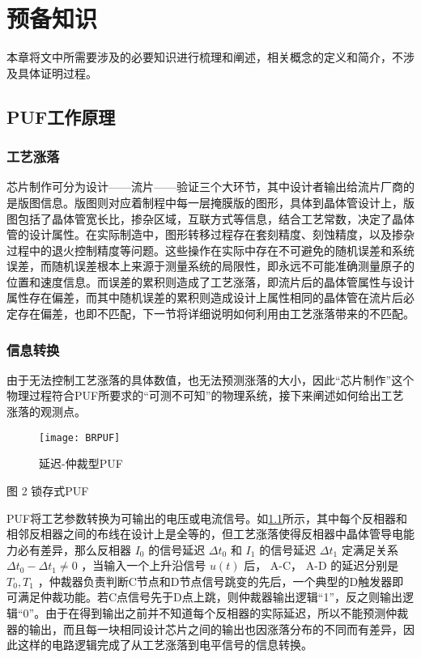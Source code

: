 
\chapter{预备知识}\label{chap:preliminary}
本章将文中所需要涉及的必要知识进行梳理和阐述，相关概念的定义和简介，不涉及具体证明过程。

\section{PUF工作原理}%
\subsection{工艺涨落}%
芯片制作可分为设计——流片——验证三个大环节，其中设计者输出给流片厂商的是版图信息。版图则对应着制程中每一层掩膜版的图形，具体到晶体管设计上，版图包括了晶体管宽长比，掺杂区域，互联方式等信息，结合工艺常数，决定了晶体管的设计属性。在实际制造中，图形转移过程存在套刻精度、刻蚀精度，以及掺杂过程中的退火控制精度等问题。这些操作在实际中存在不可避免的随机误差和系统误差，而随机误差根本上来源于测量系统的局限性，即永远不可能准确测量原子的位置和速度信息。而误差的累积则造成了工艺涨落，即流片后的晶体管属性与设计属性存在偏差，而其中随机误差的累积则造成设计上属性相同的晶体管在流片后必定存在偏差，也即不匹配，下一节将详细说明如何利用由工艺涨落带来的不匹配。
\subsection{信息转换}
由于无法控制工艺涨落的具体数值，也无法预测涨落的大小，因此``芯片制作''这个物理过程符合PUF所要求的``可测不可知''的物理系统，接下来阐述如何给出工艺涨落的观测点。

\begin{figure}[htb!]
\centering
\texttt{[image: BRPUF]}
\caption{延迟-仲裁型PUF}
\label{fig:arb-puf}
\end{figure}
 
图 2 锁存式PUF

PUF将工艺参数转换为可输出的电压或电流信号。如\ref{fig:arb-puf}所示，其中每个反相器和相邻反相器之间的布线在设计上是全等的，但工艺涨落使得反相器中晶体管导电能力必有差异，那么反相器 $ I_0 $ 的信号延迟 $ \Delta t_0 $ 和 $ I_1 $ 的信号延迟 $ \Delta t_1 $ 定满足关系 $ \Delta t_0-\Delta t_1\neq 0 $ ，当输入一个上升沿信号 $ u(t) $ 后， A-C， A-D 的延迟分别是 $ T_0,T_1 $ ，仲裁器负责判断C节点和D节点信号跳变的先后，一个典型的D触发器即可满足仲裁功能。若C点信号先于D点上跳，则仲裁器输出逻辑``1''，反之则输出逻辑``0''。由于在得到输出之前并不知道每个反相器的实际延迟，所以不能预测仲裁器的输出，而且每一块相同设计芯片之间的输出也因涨落分布的不同而有差异，因此这样的电路逻辑完成了从工艺涨落到电平信号的信息转换。


